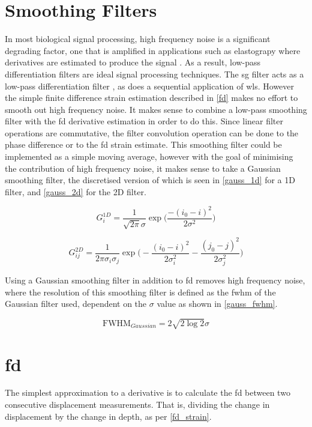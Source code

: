 \section{Smoothing Filters}
In most biological signal processing, high frequency noise is a significant degrading factor, one that is amplified in applications such as elastograpy where derivatives are estimated to produce the signal \cite{usui_digital_1982}. As a result, low-pass differentiation filters are ideal signal processing techniques. The \ac{sg} filter acts as a low-pass differentiation filter \cite{luo_axial_2004}, as does a sequential application of \ac{wls}. However the simple finite difference strain estimation described in \autoref{fd} makes no effort to smooth out high frequency noise. It makes sense to combine a low-pass smoothing filter with the \ac{fd} derivative estimation in order to do this. Since linear filter operations are commutative, the filter convolution operation can be done to the phase difference or to the \ac{fd} strain estimate. This smoothing filter could be implemented as a simple moving average, however with the goal of minimising the contribution of high frequency noise, it makes sense to take a Gaussian smoothing filter, the discretised version of which is seen in \autoref{gauss_1d} for a 1D filter, and \autoref{gauss_2d} for the 2D filter.

\begin{equation}
	\label{gauss_1d}
	G^{1D}_i = \frac{1}{\sqrt{2\pi} \sigma} \exp{\bigg(\frac{-(i_0-i)^2}{2 \sigma^2}\bigg)}
\end{equation}

\begin{equation}
	\label{gauss_2d}
	G^{2D}_{ij} = \frac{1}{2\pi \sigma_i \sigma_j } \exp{ 
	\bigg( - \frac{(i_0 - i)^2}{2 \sigma_i^2} - \frac{(j_0 - j)^2}{2 \sigma_j^2} \bigg)}
\end{equation}

Using a Gaussian smoothing filter in addition to \ac{fd} removes high frequency noise, where the resolution of this smoothing filter is defined as the \ac{fwhm} of the Gaussian filter used, dependent on the $\sigma$ value as shown in \autoref{gauss_fwhm}.

\begin{equation}
	\label{gauss_fwhm}
	\text{FWHM}_{Gaussian} = 2 \sqrt{2 \log{2}} \sigma
\end{equation}

\section{\ac{fd}}\label{fd}
The simplest approximation to a derivative is to calculate the \ac{fd} between two consecutive displacement measurements. That is, dividing the change in displacement by the change in depth, as per \autoref{fd_strain}.

